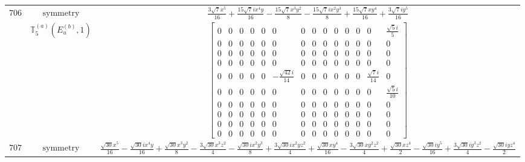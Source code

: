 \documentclass[fleqn,8pt,landscape]{jsarticle}
\begin{document}
\begin{longtable}{ccc}
$ 706 $ & $ \text{symmetry} $ & $ \frac{3 \sqrt{7} x^{5}}{16} + \frac{15 \sqrt{7} i x^{4} y}{16} - \frac{15 \sqrt{7} x^{3} y^{2}}{8} - \frac{15 \sqrt{7} i x^{2} y^{3}}{8} + \frac{15 \sqrt{7} x y^{4}}{16} + \frac{3 \sqrt{7} i y^{5}}{16} $ \\
$  $ & $ \mathbb{T}_{5}^{(a)}(E_{u}^{(b)},1) $ & $ \begin{bmatrix} 0 & 0 & 0 & 0 & 0 & 0 & 0 & 0 & 0 & 0 & 0 & 0 & 0 & \frac{\sqrt{5} i}{5} \\ 0 & 0 & 0 & 0 & 0 & 0 & 0 & 0 & 0 & 0 & 0 & 0 & 0 & 0 \\ 0 & 0 & 0 & 0 & 0 & 0 & 0 & 0 & 0 & 0 & 0 & 0 & 0 & 0 \\ 0 & 0 & 0 & 0 & 0 & 0 & 0 & 0 & 0 & 0 & 0 & 0 & 0 & 0 \\ 0 & 0 & 0 & 0 & 0 & - \frac{\sqrt{42} i}{14} & 0 & 0 & 0 & 0 & 0 & 0 & \frac{\sqrt{7} i}{14} & 0 \\ 0 & 0 & 0 & 0 & 0 & 0 & 0 & 0 & 0 & 0 & 0 & 0 & 0 & \frac{\sqrt{5} i}{10} \\ 0 & 0 & 0 & 0 & 0 & 0 & 0 & 0 & 0 & 0 & 0 & 0 & 0 & 0 \\ 0 & 0 & 0 & 0 & 0 & 0 & 0 & 0 & 0 & 0 & 0 & 0 & 0 & 0 \\ 0 & 0 & 0 & 0 & 0 & 0 & 0 & 0 & 0 & 0 & 0 & 0 & 0 & 0 \\ 0 & 0 & 0 & 0 & 0 & 0 & 0 & 0 & 0 & 0 & 0 & 0 & 0 & 0 \end{bmatrix} $ \\ \hline
$ 707 $ & $ \text{symmetry} $ & $ \frac{\sqrt{30} x^{5}}{16} - \frac{\sqrt{30} i x^{4} y}{16} + \frac{\sqrt{30} x^{3} y^{2}}{8} - \frac{3 \sqrt{30} x^{3} z^{2}}{4} - \frac{\sqrt{30} i x^{2} y^{3}}{8} + \frac{3 \sqrt{30} i x^{2} y z^{2}}{4} + \frac{\sqrt{30} x y^{4}}{16} - \frac{3 \sqrt{30} x y^{2} z^{2}}{4} + \frac{\sqrt{30} x z^{4}}{2} - \frac{\sqrt{30} i y^{5}}{16} + \frac{3 \sqrt{30} i y^{3} z^{2}}{4} - \frac{\sqrt{30} i y z^{4}}{2} $ \\

\end{longtable}
\end{document}

